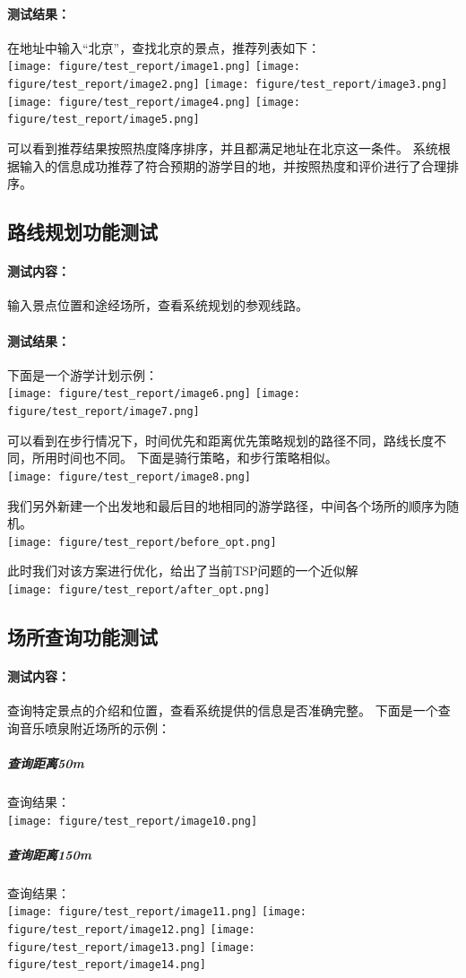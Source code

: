 \documentclass{report}
\begin{document}
\paragraph{测试结果：}
在地址中输入“北京”，查找北京的景点，推荐列表如下：\\
\texttt{[image: figure/test\_report/image1.png]}
\texttt{[image: figure/test\_report/image2.png]}
\texttt{[image: figure/test\_report/image3.png]}
\texttt{[image: figure/test\_report/image4.png]}
\texttt{[image: figure/test\_report/image5.png]}
\par
可以看到推荐结果按照热度降序排序，并且都满足地址在北京这一条件。
系统根据输入的信息成功推荐了符合预期的游学目的地，并按照热度和评价进行了合理排序。

\subsection{路线规划功能测试}
\paragraph{测试内容：}
输入景点位置和途经场所，查看系统规划的参观线路。
\paragraph{测试结果：}
下面是一个游学计划示例：\\
\texttt{[image: figure/test\_report/image6.png]}
\texttt{[image: figure/test\_report/image7.png]}
\par
可以看到在步行情况下，时间优先和距离优先策略规划的路径不同，路线长度不同，所用时间也不同。
下面是骑行策略，和步行策略相似。
\\
\texttt{[image: figure/test\_report/image8.png]}
\par
我们另外新建一个出发地和最后目的地相同的游学路径，中间各个场所的顺序为随机。\\
\texttt{[image: figure/test\_report/before\_opt.png]}
\par
此时我们对该方案进行优化，给出了当前TSP问题的一个近似解\\
\texttt{[image: figure/test\_report/after\_opt.png]}

\subsection{场所查询功能测试}
\paragraph{测试内容：}
查询特定景点的介绍和位置，查看系统提供的信息是否准确完整。
下面是一个查询音乐喷泉附近场所的示例：
\subparagraph*{查询距离50m}
查询结果：\\
\texttt{[image: figure/test\_report/image10.png]}
\subparagraph*{查询距离150m}
查询结果：\\
\texttt{[image: figure/test\_report/image11.png]}
\texttt{[image: figure/test\_report/image12.png]}
\texttt{[image: figure/test\_report/image13.png]}
\texttt{[image: figure/test\_report/image14.png]}
\end{document}
